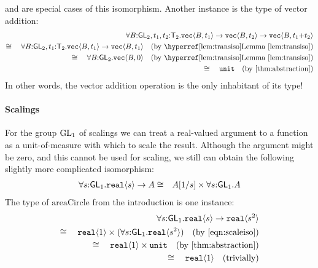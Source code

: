  and  are special cases of
this isomorphism. Another instance is the type of vector addition:
\begin{align*}
\forall B\mathord:\SynGL{2}, t_1, t_2\mathord:\SynTransl{2}.\tyPrim{vec}{B,t_1}\to\tyPrim{vec}{B,t_2}\to\tyPrim{vec}{B,t_1\mathord+t_2}\\
\cong\quad\forall B\mathord:\SynGL{2}, t_1\mathord:\SynTransl{2}.\tyPrim{vec}{B,t_1}\to\tyPrim{vec}{B,t_1}
\quad (\text{by~\lemref{lem:transiso}})\\
\cong\quad\forall B\mathord:\SynGL{2}.\tyPrim{vec}{B,0} \quad (\text{by~\lemref{lem:transiso}})\\
\cong\quad\tyUnit\quad(\text{by \autoref{thm:abstraction}})
\end{align*}
In other words, the vector addition operation is the only inhabitant of its type!
\paragraph{Scalings}
For the group $\mathrm{GL}_1$ of scalings we can treat
a real-valued argument to a function as a unit-of-measure with
which to scale the result. 
Although the argument might be zero, and this cannot be used for scaling,
we still can obtain the following slightly more complicated
isomorphism:
\begin{eqnarray}
\forall s\mathord:\mathsf{GL}_1.\textup{\texttt{real}}\langle s \rangle\to A &
\cong & A[1/s]\times \forall s\mathord:\mathsf{GL}_1.A\label{eqn:scaleiso}
\end{eqnarray}
The type of $\mathrm{areaCircle}$ from the introduction is one instance:
\begin{align*}
\forall s\mathord:\SynGL{1}.\tyPrim{real}{s}\to\tyPrim{real}{s^2}\\ 
\cong\quad\tyPrim{real}{1}\times(\forall
s\mathord:\SynGL{1}.\tyPrim{real}{s^2}) \quad(\text{by \autoref{eqn:scaleiso}})\\ 
\cong\quad\tyPrim{real}{1}\times \tyUnit \quad (\text{by \autoref{thm:abstraction}})\\
\cong\quad\tyPrim{real}{1}\quad (\text{trivially})
\end{align*}

